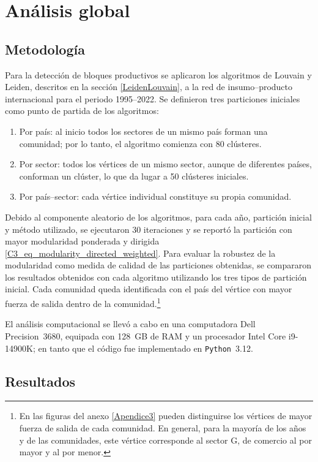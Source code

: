 \section{Análisis global}

\subsection{Metodología}

Para la detección de bloques productivos se aplicaron los algoritmos de Louvain y Leiden, descritos en la sección \ref{LeidenLouvain}, a la red de insumo--producto internacional para el periodo 1995--2022. Se definieron tres particiones iniciales como punto de partida de los algoritmos: 
\begin{enumerate}[label=\alph*)]
	\item Por país: al inicio todos los sectores de un mismo país forman una comunidad; por lo tanto, el algoritmo comienza con 80 clústeres.
	\item Por sector: todos los vértices de un mismo sector, aunque de diferentes países, conforman un clúster, lo que da lugar a 50 clústeres iniciales.
	\item Por país--sector: cada vértice individual constituye su propia comunidad. 
\end{enumerate}
Debido al componente aleatorio de los algoritmos, para cada año, partición inicial y método utilizado, se ejecutaron 30 iteraciones y se reportó la partición con mayor modularidad ponderada y dirigida \eqref{C3_eq_modularity_directed_weighted}. Para evaluar la robustez de la modularidad como medida de calidad de las particiones obtenidas, se compararon los resultados obtenidos con cada algoritmo utilizando los tres tipos de partición inicial. Cada comunidad queda identificada con el país del vértice con mayor fuerza de salida dentro de la comunidad.\footnote{En las figuras del anexo \ref{Apendice3} pueden distinguirse los vértices de mayor fuerza de salida de cada comunidad. En general, para la mayoría de los años y de las comunidades, este vértice corresponde al sector G, de comercio al por mayor y al por menor.}

El análisis computacional se llevó a cabo en una computadora Dell Precision~3680, equipada con 128~GB de RAM y un procesador Intel Core i9-14900K; en tanto que el código fue implementado en \texttt{Python}~3.12.


\subsection{Resultados}

